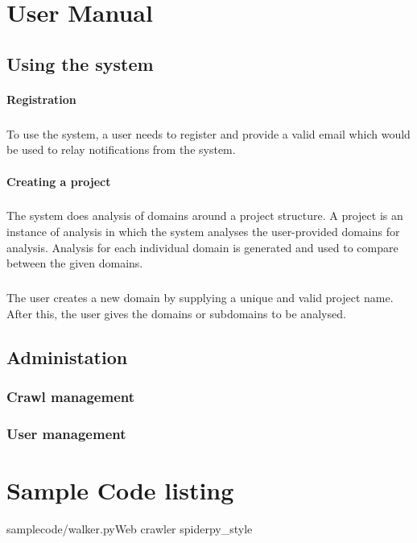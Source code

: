 \appendix
\chapter{User Manual}
\section{Using the system}
\subsubsection{Registration}
\paragraph{}
To use the system, a user needs to register and provide a valid email which would be used to relay notifications from the system.
\subsubsection{Creating a project}
\paragraph{}
The system does analysis of domains around a project structure. A project is an instance of analysis in which the system analyses the user-provided domains for analysis. Analysis for each individual domain is generated and used to compare between the given domains. 
\paragraph{}
The user creates a new domain by supplying a unique and valid project name. After this, the user gives the domains or subdomains to be analysed.

\section{Administation}

\subsection{Crawl management}

\subsection{User management}

\chapter{Sample Code listing}
	\begin{codesnippet}{samplecode/walker.py}{Web crawler spider}{py_style}
	\end{codesnippet}
